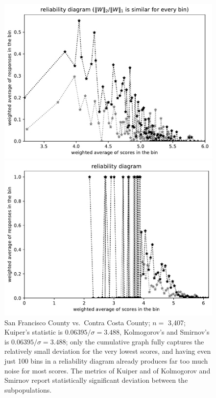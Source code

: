 \documentclass{article}
\newlength{\imsize}
\begin{document}
\begin{figure}
\begin{centering}
\parbox{\imsize}{\includegraphics[width=\imsize]
{../codes/weighted/County_of_San_Francisco_vs_Contra_Costa-LNGI/equierrs100.pdf}}
\quad\quad
\parbox{\imsize}{\includegraphics[width=\imsize]
{../codes/weighted/County_of_San_Francisco_vs_Contra_Costa-LNGI/equiscores100.pdf}}

\end{centering}
\caption{San Francisco County vs.\ Contra Costa County; $n =$ 3,407;
         Kuiper's statistic is $0.06395 / \sigma = 3.488$,
         Kolmogorov's and Smirnov's is $0.06395 / \sigma = 3.488$;
         only the cumulative graph fully captures the relatively small
         deviation for the very lowest scores, and having even just 100 bins
         in a reliability diagram already produces far too much noise
         for most scores.
         The metrics of Kuiper and of Kolmogorov and Smirnov report
         statistically significant deviation between the subpopulations.
}
\label{San_Francisco-Contra_Costa}
\end{figure}
\end{document}
